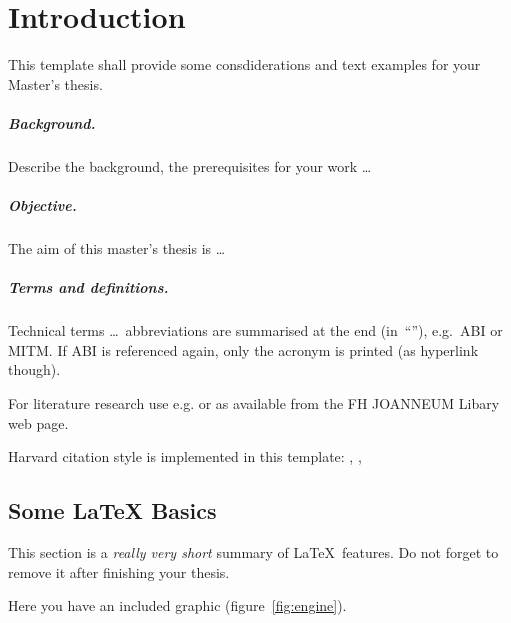\chapter{Introduction}\label{chap:introduction}
\chapterstart

This template shall provide some consdiderations and text examples for your Master's thesis.

\paragraph{Background.}
Describe the background, the prerequisites for your work \ldots


\paragraph{Objective.}
The aim of this master's thesis is \ldots


\paragraph{Terms and definitions.}
Technical terms \ldots\ abbreviations are summarised at the end (in~``''), e.g.\ \ac{ABI} or \ac{MITM}. If \ac{ABI} is referenced again, only the acronym is printed (as hyperlink though).

For literature research use e.g.  \parencite{acm:diglibrary} or  \parencite{ieee:xplore} as available from the FH JOANNEUM Libary web page.

Harvard citation style is implemented in this template: \citet{Batina:2011:HER:2188496.2188508}, \citet{Fernandez-Mir:2011:SRA:2188496.2188506}, \citet{Li:2008:TRP:2043628.2043631}


\section{Some \LaTeX{} Basics}
This section is a \textit{really very short} summary of \LaTeX\ features. Do not forget to remove it after finishing your thesis.

Here you have an included graphic (figure~\ref{fig:engine}).

